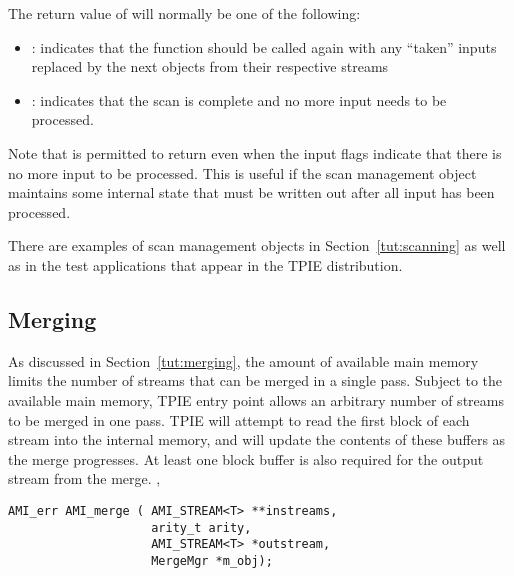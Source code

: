 The return value of  will normally be one
of the following:
\begin{itemize}
    \item {}:
     indicates that the
    function should be called again with any ``taken'' inputs
    replaced by the next objects from their respective
    streams
    \item {}: indicates that the scan
    is complete and no more input needs to be processed.
\end{itemize}

Note that  is permitted to return
 even when the input flags
indicate that there is no more input to be processed.  This
is useful if the scan management object maintains some
internal state that must be written out after all input has
been processed.  

There are examples of scan management objects in
Section~\ref{tut:scanning} as well as in the test applications that
appear in the TPIE distribution.



\subsection{Merging}

As discussed in Section~\ref{tut:merging}, the amount of
available main memory limits the number of streams that can
be merged in a single pass. Subject to the available main memory, 
TPIE entry point  allows an arbitrary
number of streams to be merged in one pass. TPIE will
attempt to read the first block of each stream into the
internal memory, and will update the contents of these
buffers as the merge progresses. At least one block buffer
is also required for the output stream from the merge.
,

\begin{verbatim}
AMI_err AMI_merge ( AMI_STREAM<T> **instreams, 
                    arity_t arity,
                    AMI_STREAM<T> *outstream, 
                    MergeMgr *m_obj);
\end{verbatim}

